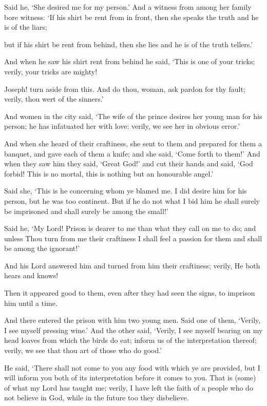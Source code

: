 \documentclass[fontsize=14pt, letterpaper, notitlepage, openany, DIV=12]{scrbook} %
\begin{document}
\noindent[12:26]
Said he, `She desired me for my person.' And a witness from among her family bore
witness: `If his shirt be rent from in front, then she speaks the truth and he is of the liars;

\noindent[12:27]
but if his shirt be rent from behind, then she lies and he is of the truth tellers.'

\noindent[12:28]
And when he saw his shirt rent from behind he said, `This is one of your tricks; verily,
your tricks are mighty!

\noindent[12:29]
Joseph! turn aside from this. And do thou, woman, ask pardon for thy fault; verily, thou
wert of the sinners.'

\noindent[12:30]
And women in the city said, `The wife of the prince desires her young man for his
person; he has infatuated her with love: verily, we see her in obvious error.'

\noindent[12:31]
And when she heard of their craftiness, she sent to them and prepared for them a banquet,
and gave each of them a knife; and she said, `Come forth to them!' And when they saw him they
said, `Great God!' and cut their hands and said, `God forbid! This is no mortal, this is nothing
but an honourable angel.'

\noindent[12:32]
Said she, `This is he concerning whom ye blamed me. I did desire him for his person, but
he was too continent. But if he do not what I bid him he shall surely be imprisoned and shall
surely be among the small!'

\noindent[12:33]
Said he, `My Lord! Prison is dearer to me than what they call on me to do; and unless
Thou turn from me their craftiness I shall feel a passion for them and shall be among the
ignorant!'

\noindent[12:34]
And his Lord answered him and turned from him their craftiness; verily, He both hears
and knows!

\noindent[12:35]
Then it appeared good to them, even after they had seen the signs, to imprison him until a
time.

\noindent[12:36]
And there entered the prison with him two young men. Said one of them, `Verily, I see
myself pressing wine.' And the other said, `Verily, I see myself bearing on my head loaves from
which the birds do eat; inform us of the interpretation thereof; verily, we see that thou art of
those who do good.'

\noindent[12:37]
He said, `There shall not come to you any food with which ye are provided, but I will
inform you both of its interpretation before it comes to you. That is (some) of what my Lord has
taught me; verily, I have left the faith of a people who do not believe in God, while in the future
too they disbelieve.
\end{document}
